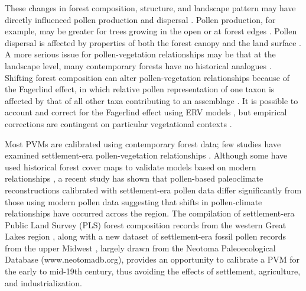 \documentclass[12pt]{article}
\begin{document}
These changes in forest composition, structure, and landscape pattern
may have directly influenced pollen production and dispersal
\citep{kujawa2016}.  Pollen production, for example, may be greater
for trees growing in the open or at forest edges
\citep{feldman1999cost}.  Pollen dispersal is affected by properties
of both the forest canopy and the land surface
\citep{jackson1999pollen}.  A more serious issue for pollen-vegetation
relationships may be that at the landscape level, many contemporary
forests have no historical analogues \citep{goring_witness}. Shifting
forest composition can alter pollen-vegetation relationships because
of the Fagerlind effect, in which relative pollen representation of
one taxon is affected by that of all other taxa contributing to an
assemblage \citep{prentice1988records}. It is possible to account and
correct for the Fagerlind effect using ERV models \citep{prentice1986,
  jackson1995exploration}, but empirical corrections are contingent on
particular vegetational contexts \citep{jackson1998quantitative}.

Most PVMs are calibrated using contemporary forest data; few studies
have examined settlement-era pollen-vegetation relationships
\citep{schwartz1989predicting}. Although some have used historical
forest cover maps to validate models based on modern relationships
\citep{nielsen2004modelling}, a recent study has shown that
pollen-based paleoclimate reconstructions calibrated with
settlement-era pollen data differ significantly from those using
modern pollen data \citep{st2014bias} suggesting that shifts in
pollen-climate relationships have occurred across the region. The
compilation of settlement-era Public Land Survey (PLS) forest
composition records from the western Great Lakes region
\citep{bourdo1956review, schulte2001original,
  almendinger1996minnesota, liu2011broadscale, goring_witness}, along
with a new dataset of settlement-era fossil pollen records from the
upper Midwest \citep{kujawa2016}, largely drawn from the Neotoma
Paleoecological Database (www.neotomadb.org), provides an opportunity
to calibrate a PVM for the early to mid-19th century, thus avoiding
the effects of settlement, agriculture, and industrialization.
\end{document}
